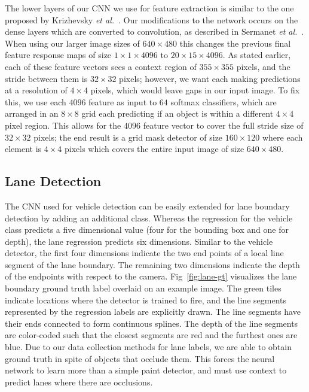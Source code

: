 \documentclass[journal]{IEEEtran}
\begin{document}
The lower layers of our CNN we use for feature extraction is similar to the one proposed by Krizhevsky \textit{et al.}~\cite{krizhevsky-2012}. Our modifications to the network occurs on the dense layers which are converted to convolution, as described in Sermanet \textit{et al.}~\cite{sermanet-2013}. When using our larger image sizes of $640 \times 480$ this changes the previous final feature response maps of size $1\times 1\times 4096$ to $20 \times 15 \times 4096$. As stated earlier, each of these feature vectors sees a context region of $355 \times 355$ pixels, and the stride between them is $32 \times 32$ pixels; however, we want each making predictions at a resolution of $4 \times 4$ pixels, which would leave gaps in our input image. To fix this, we use each $4096$ feature as input to $64$ softmax classifiers, which are arranged in an $8 \times 8$ grid each predicting if an object is within a different $4 \times 4$ pixel region. This allows for the $4096$ feature vector to cover the full stride size of $32 \times 32$ pixels; the end result is a grid mask detector of size $160 \times 120$ where each element is $4 \times 4$ pixels which covers the entire input image of size $640 \times 480$.

\subsection{Lane Detection}
The CNN used for vehicle detection can be easily extended for lane boundary detection by adding an additional class. Whereas the regression for the vehicle class predicts a five dimensional value (four for the bounding box and one for depth), the lane regression predicts six dimensions. Similar to the vehicle detector, the first four dimensions indicate the two end points of a local line segment of the lane boundary. The remaining two dimensions
indicate the depth of the endpoints with respect to the camera. Fig~\ref{fig:lane-gt} visualizes the lane boundary ground truth label overlaid on an example image. The green tiles indicate locations where the detector is trained to fire, and the line segments represented by the regression labels are explicitly drawn. The line segments have their ends connected to form continuous splines. The depth of the line segments are color-coded such that the closest segments are red and the furthest ones are blue. Due to our data collection methods for lane labels, we are able to obtain ground truth in spite of objects that occlude them. This forces the neural network to learn more than a simple paint detector, and must use context to predict lanes where there are occlusions.
\end{document}
